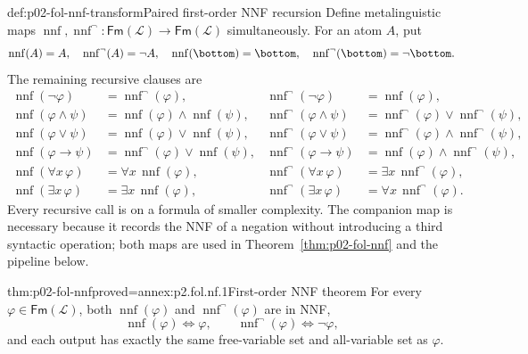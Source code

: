 \begin{hbmethod}{def:p02-fol-nnf-transform}{Paired first-order NNF recursion}
Define metalinguistic maps
\(\operatorname{nnf},\operatorname{nnf}^{\neg}:
\mathsf{Fm}(\mathcal L)\to\mathsf{Fm}(\mathcal L)\) simultaneously.
For an atom \(A\), put
\[
 \operatorname{nnf}(A)=A,
 \quad \operatorname{nnf}^{\neg}(A)=\neg A,
 \quad \operatorname{nnf}(\bottom)=\bottom,
 \quad \operatorname{nnf}^{\neg}(\bottom)=\neg\bottom.
\]
The remaining recursive clauses are
\[
\begin{aligned}
 \operatorname{nnf}(\neg\varphi)
   &=\operatorname{nnf}^{\neg}(\varphi),&
 \operatorname{nnf}^{\neg}(\neg\varphi)
   &=\operatorname{nnf}(\varphi),\\
 \operatorname{nnf}(\varphi\land\psi)
   &=\operatorname{nnf}(\varphi)\land\operatorname{nnf}(\psi),&
 \operatorname{nnf}^{\neg}(\varphi\land\psi)
   &=\operatorname{nnf}^{\neg}(\varphi)\lor
     \operatorname{nnf}^{\neg}(\psi),\\
 \operatorname{nnf}(\varphi\lor\psi)
   &=\operatorname{nnf}(\varphi)\lor\operatorname{nnf}(\psi),&
 \operatorname{nnf}^{\neg}(\varphi\lor\psi)
   &=\operatorname{nnf}^{\neg}(\varphi)\land
     \operatorname{nnf}^{\neg}(\psi),\\
 \operatorname{nnf}(\varphi\to\psi)
   &=\operatorname{nnf}^{\neg}(\varphi)\lor\operatorname{nnf}(\psi),&
 \operatorname{nnf}^{\neg}(\varphi\to\psi)
   &=\operatorname{nnf}(\varphi)\land
     \operatorname{nnf}^{\neg}(\psi),\\
 \operatorname{nnf}(\forall x\,\varphi)
   &=\forall x\,\operatorname{nnf}(\varphi),&
 \operatorname{nnf}^{\neg}(\forall x\,\varphi)
   &=\exists x\,\operatorname{nnf}^{\neg}(\varphi),\\
 \operatorname{nnf}(\exists x\,\varphi)
   &=\exists x\,\operatorname{nnf}(\varphi),&
 \operatorname{nnf}^{\neg}(\exists x\,\varphi)
   &=\forall x\,\operatorname{nnf}^{\neg}(\varphi).
\end{aligned}
\]
Every recursive call is on a formula of smaller complexity.  The companion
map is necessary because it records the NNF of a negation without introducing
a third syntactic operation; both maps are used in
Theorem~\ref{thm:p02-fol-nnf} and the pipeline below.
\end{hbmethod}

\begin{hblemma}{thm:p02-fol-nnf}{proved=annex:p2.fol.nf.1}{First-order NNF theorem}
For every \(\varphi\in\mathsf{Fm}(\mathcal L)\), both
\(\operatorname{nnf}(\varphi)\) and
\(\operatorname{nnf}^{\neg}(\varphi)\) are in NNF,
\[
 \operatorname{nnf}(\varphi)\Leftrightarrow\varphi,
 \qquad
 \operatorname{nnf}^{\neg}(\varphi)\Leftrightarrow\neg\varphi,
\]
and each output has exactly the same free-variable set and all-variable set
as \(\varphi\).
\end{hblemma}

